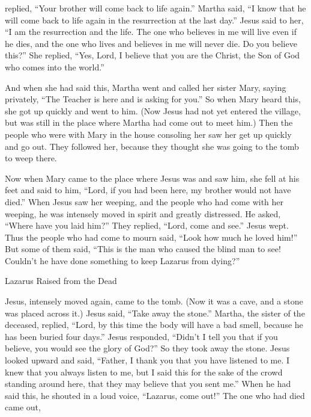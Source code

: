 {replied, “Your
brother
will come back to life again.”
Martha
said, “I know
that
he will come back to life again
in
the resurrection
at
the last
day.”
Jesus
said
to her,
“I
am
the resurrection
and
the life.
The one who believes
in
me
will live
even if
he dies,
and
the one who lives
and
believes
in
me
will
never
die.
Do you believe
this?”
She replied, “Yes,
Lord,
I
believe
that
you
are
the Christ,
the Son
of God
who comes
into
the world.”
\par }{\PP {}And
when
she had said
this,
Martha went
and
called
her
sister
Mary,
saying
privately, “The Teacher
is here
and
is asking for
you.”
So
when
Mary heard
this,
she got up
quickly
and
went
to
him.
(Now
Jesus
had
not yet
entered
the village,
but
was
still
in
the place
where
Martha
had come out to meet
him.)
Then
the people
who were
with
Mary
in
the house
consoling
her
saw
her
get up
quickly
and
go out.
They followed
her,
because
they thought
she was going
to
the tomb
to
weep
there.
\par }{\PP {}Now
when Mary
came
to the place where
Jesus
was and saw
him,
she fell
at
his
feet
and said
to him,
“Lord,
if
you had been
here,
my
brother
would
not
have died.”
When Jesus
saw
her
weeping,
and
the people who had come with
her
weeping,
he was intensely moved
in spirit
and
greatly distressed.
He
asked, “Where
have you laid
him?” They replied, “Lord,
come
and
see.”
Jesus
wept.
Thus
the people
who had come to mourn said,
“Look
how much
he loved
him!”
But
some
of
them
said,
“This
is the man who caused
the blind man
to see! Couldn’t
he have done
something to
keep
Lazarus
from
dying?”
\par }{\SH Lazarus Raised from the Dead
\par }{\PP {}Jesus,
intensely moved
again,
came
to
the tomb.
(Now it was
a cave,
and
a stone
was placed
across
it.)
Jesus
said,
“Take away
the stone.”
Martha,
the sister
of the deceased,
replied,
“Lord,
by this time
the body will have a bad smell,
because
he has been buried four days.”
Jesus
responded, “Didn’t
I tell
you
that
if
you believe,
you would see
the glory
of God?”
So
they took away
the stone.
Jesus
looked
upward
and
said,
“Father,
I thank
you
that
you have listened
to me.
I
knew
that
you always
listen
to me,
but
I said
this for the sake of
the crowd
standing around
here, that they
may
believe
that
you
sent
me.”
When
he had said
this,
he shouted
in a loud
voice, “Lazarus,
come
out!”
The one who had died
came out,
}
